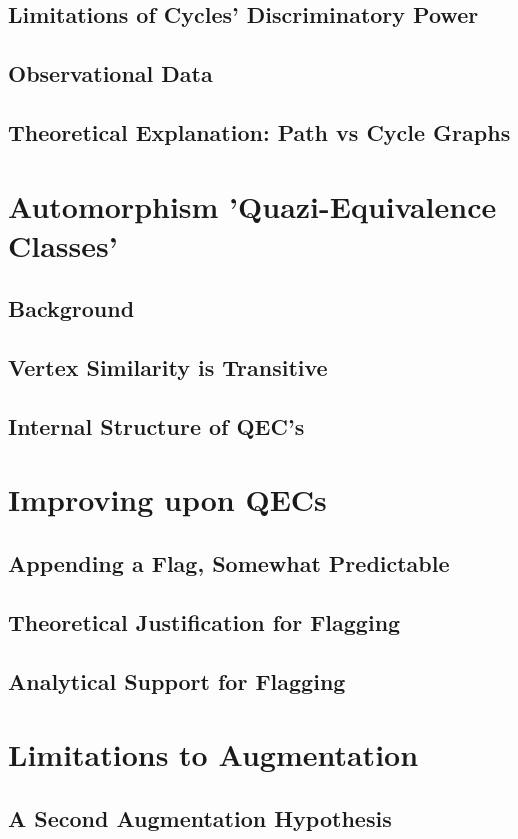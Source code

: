 \documentclass[11pt,a4paper]{report}
\begin{document}
\subsection{Limitations of Cycles' Discriminatory Power}
\subsection{Observational Data}
\subsection{Theoretical Explanation: Path vs Cycle Graphs}

\section{Automorphism 'Quazi-Equivalence Classes'}
\subsection{Background}
\subsection{Vertex Similarity is Transitive}
\subsection{Internal Structure of QEC's}

\section{Improving upon QECs}
\subsection{Appending a Flag, Somewhat Predictable}
\subsection{Theoretical Justification for Flagging}
\subsection{Analytical Support for Flagging}

\section{Limitations to Augmentation}
\subsection{A Second Augmentation Hypothesis}
\end{document}
